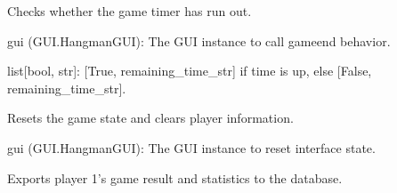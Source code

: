 \documentclass[letterpaper,10pt,english]{sphinxmanual}
\begin{document}
\begin{fulllineitems}
\label{\detokenize{modules:Game_Logic.check_time_over}}
\pysigstartsignatures
{}
\pysigstopsignatures
\sphinxAtStartPar
Checks whether the game timer has run out.
\begin{description}
\sphinxAtStartPar
gui (GUI.HangmanGUI): The GUI instance to call game\sphinxhyphen{}end behavior.

\sphinxAtStartPar
list{[}bool, str{]}: {[}True, remaining\_time\_str{]} if time is up, else {[}False, remaining\_time\_str{]}.

\end{description}

\end{fulllineitems}


\begin{fulllineitems}
\label{\detokenize{modules:Game_Logic.clear}}
\pysigstartsignatures
{}
\pysigstopsignatures
\sphinxAtStartPar
Resets the game state and clears player information.
\begin{description}
\sphinxAtStartPar
gui (GUI.HangmanGUI): The GUI instance to reset interface state.

\end{description}

\end{fulllineitems}


\begin{fulllineitems}
\label{\detokenize{modules:Game_Logic.export_player1}}
\pysigstartsignatures
{}
\pysigstopsignatures
\sphinxAtStartPar
Exports player 1’s game result and statistics to the database.

\end{fulllineitems}
\end{document}

